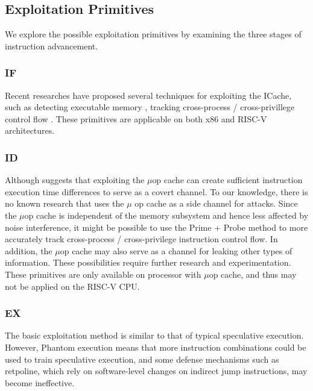 \subsection{Exploitation Primitives}

We explore the possible exploitation primitives by examining the three stages of instruction advancement.

\subsubsection{IF}

Recent researches have proposed several techniques for exploiting the ICache, such as detecting executable memory \cite{phantom}, tracking cross-process / cross-privillege control flow \cite{bunnyhop} \cite{a-secure-risc}. These primitives are applicable on both x86 and RISC-V architectures.

\subsubsection{ID}

Although \cite{dead_uop} suggests that exploiting the $\mu$op cache can create sufficient instruction execution time differences to serve as a covert channel. To our knowledge, there is no known research that uses the $\mu$ op cache as a side channel for attacks. Since the $\mu$op cache is independent of the memory subsystem and hence less affected by noise interference, it might be possible to use the Prime + Probe method to more accurately track cross-process / cross-privilege instruction control flow. In addition, the $\mu$op cache may also serve as a channel for leaking other types of information. These possibilities require further research and experimentation. These primitives are only available on processor with $\mu$op cache, and thus may not be applied on the RISC-V CPU.

\subsubsection{EX}

The basic exploitation method is similar to that of typical speculative execution. However, Phantom execution means that more instruction combinations could be used to train speculative execution, and some defense mechanisms such as retpoline, which rely on software-level changes on indirect jump instructions, may become ineffective.



